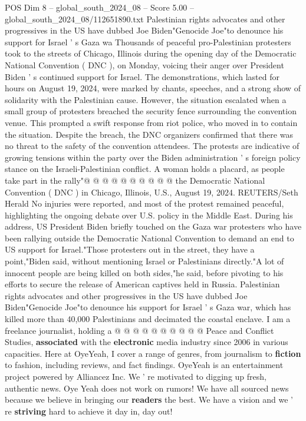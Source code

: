 \begin{textsample}{POS Dim 8 – global\_south\_2024\_08 – Score 5.00 – global\_south\_2024\_08/112651890.txt}  \label{ex:f8_pos_371}
Palestinian rights advocates and other progressives in the US have dubbed Joe Biden"Genocide Joe"to denounce his support for Israel ' s Gaza wa Thousands of peaceful pro-Palestinian protesters took to the streets of Chicago, Illinois during the opening day of the Democratic National Convention ( DNC ), on Monday, voicing their anger over President Biden ' s continued support for Israel.
The demonstrations, which lasted for hours on August 19, 2024, were marked by chants, speeches, and a strong show of solidarity with the Palestinian cause.
However, the situation escalated when a small group of protesters breached the security fence surrounding the convention venue.
This prompted a swift response from riot police, who moved in to contain the situation.
Despite the breach, the DNC organizers confirmed that there was no threat to the safety of the convention attendees.
The protests are indicative of growing tensions within the party over the Biden administration ' s foreign policy stance on the Israeli-Palestinian conflict.
A woman holds a placard, as people take part in the rally"@ @ @ @ @ @ @ @ @ @ the Democratic National Convention ( DNC ) in Chicago, Illinois, U.S., August 19, 2024.
REUTERS/Seth Herald No injuries were reported, and most of the protest remained peaceful, highlighting the ongoing debate over U.S. policy in the Middle East.
During his address, US President Biden briefly touched on the Gaza war protesters who have been rallying outside the Democratic National Convention to demand an end to US support for Israel."Those protesters out in the street, they have a point,"Biden said, without mentioning Israel or Palestinians directly."A lot of innocent people are being killed on both sides,"he said, before pivoting to his efforts to secure the release of American captives held in Russia.
Palestinian rights advocates and other progressives in the US have dubbed Joe Biden"Genocide Joe"to denounce his support for Israel ' s Gaza war, which has killed more than 40,000 Palestinians and decimated the coastal enclave.
I am a freelance journalist, holding a @ @ @ @ @ @ @ @ @ @ Peace and Conflict Studies, \textbf{associated} with the \textbf{electronic} media industry since 2006 in various capacities.
Here at OyeYeah, I cover a range of genres, from journalism to \textbf{fiction} to fashion, including reviews, and fact findings.
OyeYeah is an entertainment project powered by Alliancez Inc.
We ' re motivated to digging up fresh, authentic news.
Oye Yeah does not work on rumors!
We have all sourced news because we believe in bringing our \textbf{readers} the best.
We have a vision and we ' re \textbf{striving} hard to achieve it day in, day out!

\end{textsample}
